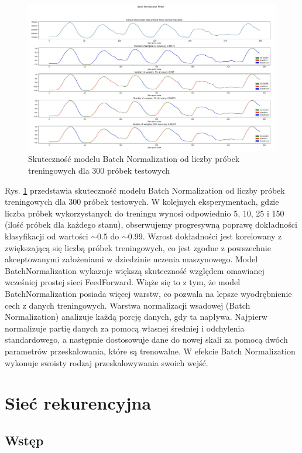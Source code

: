 \documentclass{article}
\begin{document}
\begin{figure}[H]
    \centering
    \includegraphics[width=\textwidth]{batch_normalization/skutecznosc.png}
    \caption{Skuteczność modelu Batch Normalization od liczby próbek treningowych dla 300 próbek testowych}
    \label{fig:data_chart7}
\end{figure}

Rys. \ref{fig:data_chart7} przedstawia skuteczność modelu Batch Normalization od liczby próbek treningowych dla 300 próbek testowych. W kolejnych eksperymentach, gdzie liczba próbek wykorzystanych do treningu wynosi odpowiednio 5, 10, 25 i 150 (ilość próbek dla każdego stanu), obserwujemy progresywną poprawę dokładności klasyfikacji od wartości $\sim$0.5 do $\sim$0.99. Wzrost dokładności jest korelowany z zwiększającą się liczbą próbek treningowych, co jest zgodne z powszechnie akceptowanymi założeniami w dziedzinie uczenia maszynowego. Model BatchNormalization wykazuje większą skuteczność względem omawianej wcześniej prostej sieci FeedForward. Wiąże się to z tym, że model BatchNormalization posiada więcej warstw, co pozwala na lepsze wyodrębnienie cech z danych treningowych. Warstwa normalizacji wsadowej (Batch Normalization) analizuje każdą porcję danych, gdy ta napływa. Najpierw normalizuje partię danych za pomocą własnej średniej i odchylenia standardowego, a następnie dostosowuje dane do nowej skali za pomocą dwóch parametrów przeskalowania, które są trenowalne. W efekcie Batch Normalization wykonuje swoisty rodzaj przeskalowywania swoich wejść.


\section{Sieć rekurencyjna}

\subsection{Wstęp}
\end{document}
